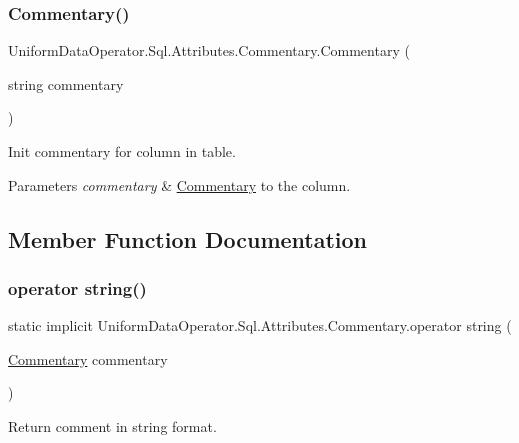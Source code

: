 \subsubsection{\texorpdfstring{Commentary()}{Commentary()}}
{\footnotesize\ttfamily Uniform\+Data\+Operator.\+Sql.\+Attributes.\+Commentary.\+Commentary (\begin{DoxyParamCaption}\item[{string}]{commentary }\end{DoxyParamCaption})}



Init commentary for column in table. 


\begin{DoxyParams}{Parameters}
{\em commentary} & \mbox{\hyperlink{class_uniform_data_operator_1_1_sql_1_1_attributes_1_1_commentary}{Commentary}} to the column.\\
\hline
\end{DoxyParams}


\subsection{Member Function Documentation}
\mbox{\label{class_uniform_data_operator_1_1_sql_1_1_attributes_1_1_commentary_adb8a38bd8b9febe1222e715e7f7309d8}} 
\subsubsection{\texorpdfstring{operator string()}{operator string()}}
{\footnotesize\ttfamily static implicit Uniform\+Data\+Operator.\+Sql.\+Attributes.\+Commentary.\+operator string (\begin{DoxyParamCaption}\item[{\mbox{\hyperlink{class_uniform_data_operator_1_1_sql_1_1_attributes_1_1_commentary}{Commentary}}}]{commentary }\end{DoxyParamCaption})\hspace{0.3cm}{\ttfamily [static]}}



Return comment in string format. 


